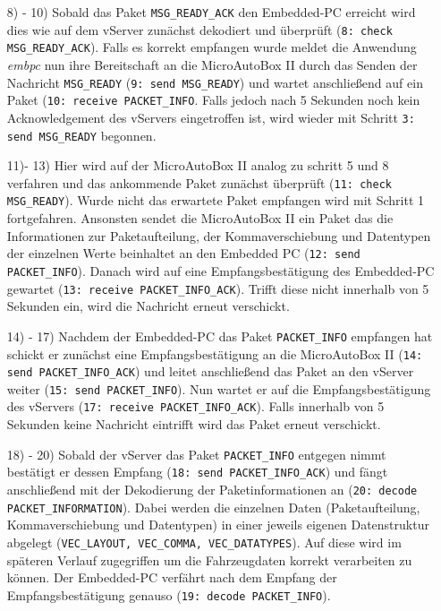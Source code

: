 \documentclass[fontsize = 12pt, paper = a4]{scrreprt}
\begin{document}
\begin{itemize}
\item[8) - 10)]
Sobald das Paket \texttt{MSG\_READY\_ACK} den Embedded-PC erreicht wird dies wie auf dem vServer zunächst dekodiert und überprüft (\texttt{8: check MSG\_READY\_ACK}). Falls es korrekt empfangen wurde meldet die Anwendung \emph{embpc} nun ihre Bereitschaft an die MicroAutoBox II durch das Senden der Nachricht \texttt{MSG\_READY} (\texttt{9: send MSG\_READY}) und wartet anschließend auf ein Paket (\texttt{10: receive PACKET\_INFO}. Falls jedoch nach 5 Sekunden noch kein Acknowledgement des vServers eingetroffen ist, wird wieder mit Schritt \texttt{3: send MSG\_READY} begonnen.

\item[11)- 13)]
Hier wird auf der MicroAutoBox II analog zu schritt 5 und 8 verfahren und das ankommende Paket zunächst überprüft (\texttt{11: check MSG\_READY}). Wurde nicht das erwartete Paket empfangen wird mit Schritt 1 fortgefahren. Ansonsten sendet die MicroAutoBox II ein Paket das die Informationen zur Paketaufteilung, der Kommaverschiebung  und Datentypen der einzelnen Werte beinhaltet an den Embedded PC (\texttt{12: send PACKET\_INFO}). Danach wird auf eine Empfangsbestätigung des Embedded-PC gewartet (\texttt{13: receive PACKET\_INFO\_ACK}). Trifft diese nicht innerhalb von 5 Sekunden ein, wird die Nachricht erneut verschickt. 

\item[14) - 17)]
Nachdem der Embedded-PC das Paket \texttt{PACKET\_INFO} empfangen hat schickt er zunächst eine Empfangsbestätigung an die MicroAutoBox II (\texttt{14: send PACKET\_INFO\_ACK}) und leitet anschließend das Paket an den vServer weiter (\texttt{15: send PACKET\_INFO}). Nun wartet er auf die Empfangsbestätigung des vServers (\texttt{17: receive PACKET\_INFO\_ACK}). Falls innerhalb von 5 Sekunden keine Nachricht eintrifft wird das Paket erneut verschickt.

\item[18) - 20)]
Sobald der vServer das Paket \texttt{PACKET\_INFO} entgegen nimmt bestätigt er dessen Empfang (\texttt{18: send PACKET\_INFO\_ACK}) und fängt anschließend mit der Dekodierung der Paketinformationen an (\texttt{20: decode PACKET\_INFORMATION}). Dabei werden die einzelnen Daten (Paketaufteilung, Kommaverschiebung und Datentypen) in einer jeweils eigenen Datenstruktur abgelegt (\texttt{VEC\_LAYOUT, VEC\_COMMA, VEC\_DATATYPES}). Auf diese wird im späteren Verlauf zugegriffen um die Fahrzeugdaten korrekt verarbeiten zu können. Der Embedded-PC verfährt nach dem Empfang der Empfangsbestätigung genauso (\texttt{19: decode PACKET\_INFO}).

\end{itemize}
\end{document}
